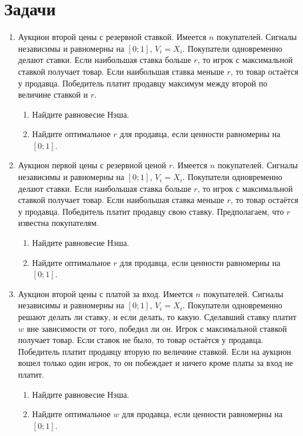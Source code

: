 \section{Задачи}
\begin{enumerate}
\item Аукцион второй цены с резервной ставкой. Имеется $ n $ покупателей.  Сигналы независимы и равномерны на $ [0;1] $, $ V_{i}=X_{i} $. Покупатели одновременно делают ставки. Если наибольшая ставка больше $ r $, то игрок с максимальной ставкой получает товар. Если наибольшая ставка меньше $ r $, то товар остаётся у продавца. Победитель платит продавцу максимум между второй по величине ставкой и $ r $.
\begin{enumerate}
\item Найдите равновесие Нэша.
\item Найдите оптимальное $ r $ для продавца, если ценности равномерны на $ [0;1] $.
\end{enumerate}


\item Аукцион первой цены с резервной ценой $ r $. Имеется $ n $ покупателей.  Сигналы независимы и равномерны на $ [0;1] $, $ V_{i}=X_{i} $. Покупатели одновременно делают ставки. Если наибольшая ставка больше $ r $, то игрок с максимальной ставкой получает товар. Если наибольшая ставка меньше $ r $, то товар остаётся у продавца. Победитель платит продавцу свою ставку. Предполагаем, что $ r $ известна покупателям.
\begin{enumerate}
\item Найдите равновесие Нэша.
\item Найдите оптимальное $ r $ для продавца, если ценности равномерны на $ [0;1] $.
\end{enumerate}


\item Аукцион второй цены с платой за вход. Имеется $ n $ покупателей.  Сигналы независимы и равномерны на $ [0;1] $, $ V_{i}=X_{i} $. Покупатели одновременно решают делать ли ставку, и если делать, то какую. Сделавший ставку платит $ w $ вне зависимости от того, победил ли он. Игрок с максимальной ставкой получает товар. Если ставок не было, то товар остаётся у продавца. Победитель платит продавцу вторую по величине ставкой. Если на аукцион вошел только один игрок, то он побеждает и  ничего кроме платы за вход не платит.
\begin{enumerate}
\item Найдите равновесие Нэша.
\item Найдите оптимальное $ w $ для продавца, если ценности равномерны на $ [0;1] $.
\end{enumerate}



\end{enumerate}
